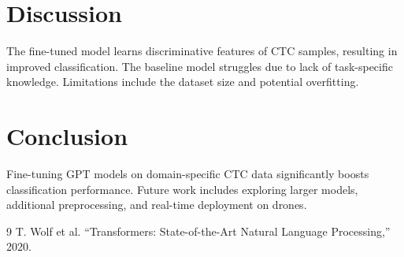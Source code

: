 \documentclass{article}
\begin{document}
\section{Discussion}
The fine-tuned model learns discriminative features of CTC samples, resulting in improved classification. The baseline model struggles due to lack of task-specific knowledge. Limitations include the dataset size and potential overfitting.

\section{Conclusion}
Fine-tuning GPT models on domain-specific CTC data significantly boosts classification performance. Future work includes exploring larger models, additional preprocessing, and real-time deployment on drones.


\begin{thebibliography}{9}
T. Wolf et al. ``Transformers: State-of-the-Art Natural Language Processing,'' 2020.
\end{thebibliography}
\end{document}
